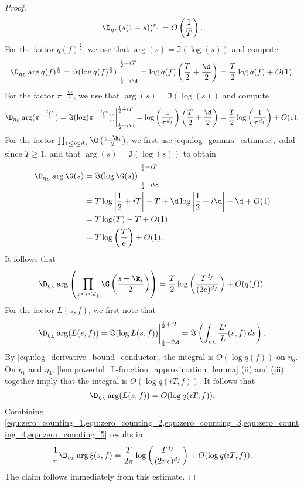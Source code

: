 \begin{proof}
      \begin{equation}\label{equ:zero_counting_1}
        \D_{\eta_{L}}(s(1-s))^{r_{f}} = O\left(\frac{1}{T}\right).
      \end{equation}
      For the factor $q(f)^{\frac{s}{2}}$, we use that $\arg(s) = \Im(\log(s))$ and compute
      \begin{equation}\label{equ:zero_counting_2}
        \D_{\eta_{L}}\arg{q(f)^{\frac{s}{2}}} = \Im(\log{q(f)^{\frac{s}{2}}})\bigg|_{\frac{1}{2}-i\d}^{\frac{1}{2}+iT} = \log{q(f)}\left(\frac{T}{2}+\frac{\d}{2}\right) = \frac{T}{2}\log{q(f)}+O(1).
      \end{equation}
      For the factor $\pi^{-\frac{d_{f}s}{2}}$, we use that $\arg(s) = \Im(\log(s))$ and compute
      \begin{equation}\label{equ:zero_counting_3}
        \D_{\eta_{L}}\arg(\pi^{-\frac{d_{f}s}{2}}) = \Im(\log(\pi^{-\frac{d_{f}s}{2}}))\bigg|_{\frac{1}{2}-i\d}^{\frac{1}{2}+iT} = \log\left(\frac{1}{\pi^{d_{f}}}\right)\left(\frac{T}{2}+\frac{\d}{2}\right) = \frac{T}{2}\log\left(\frac{1}{\pi^{d_{f}}}\right)+O(1).
      \end{equation}
      For the factor $\prod_{1 \le i \le d_{f}}\G\left(\frac{s+\k_{i}}{2}\right)$, we first use \cref{equ:log_gamma_estimate}, valid since $T \ge 1$, and that $\arg(s) = \Im(\log(s))$ to obtain
      \begin{align*}
        \D_{\eta_{L}}\arg\G(s) &= \Im(\log\G(s))\bigg|_{\frac{1}{2}-i\d}^{\frac{1}{2}+iT} \\
        &= T\log\left|\frac{1}{2}+iT\right|-T+\d\log\left|\frac{1}{2}+i\d\right|-\d+O(1) \\
        &= T\log(T)-T+O(1) \\
        &= T\log\left(\frac{T}{e}\right)+O(1).
      \end{align*}
      It follows that
      \begin{equation}\label{equ:zero_counting_4}
        \D_{\eta_{L}}\arg\left(\prod_{1 \le i \le d_{f}}\G\left(\frac{s+\k_{i}}{2}\right)\right) = \frac{T}{2}\log\left(\frac{T^{d_{f}}}{(2e)^{d_{f}}}\right)+O(q(f)).
      \end{equation}
      For the factor $L(s,f)$, we first note that
      \[
        \D_{\eta_{L}}\arg(L(s,f)) = \Im(\log{L(s,f)})\bigg|_{\frac{1}{2}-i\d}^{\frac{1}{2}+iT} = \Im\left(\int_{\eta_{L}}\frac{L'}{L}(s,f)\,ds\right).
      \]
      By \cref{equ:log_derivative_bound_conductor}, the integral is $O(\log{q(f)})$ on $\eta_{2}$. On $\eta_{1}$ and $\eta_{3}$, \cref{lem:powerful_L-function_approximation_lemma} (ii) and (iii) together imply that the integral is $O(\log{q(iT,f)})$. It follows that
      \begin{equation}\label{equ:zero_counting_5}
        \D_{\eta_{L}}\arg(L(s,f)) = O(\log{q(iT,f)}).
      \end{equation}
      Combining \cref{equ:zero_counting_1,equ:zero_counting_2,equ:zero_counting_3,equ:zero_counting_4,equ:zero_counting_5} results in
      \[
        \frac{1}{\pi}\D_{\eta_{L}}\arg\xi(s,f) = \frac{T}{2\pi}\log\left(\frac{T^{d_{f}}}{(2\pi e)^{d_{f}}}\right)+O(\log{q(iT,f)}).
      \]
      The claim follows immediately from this estimate.
    \end{proof}

